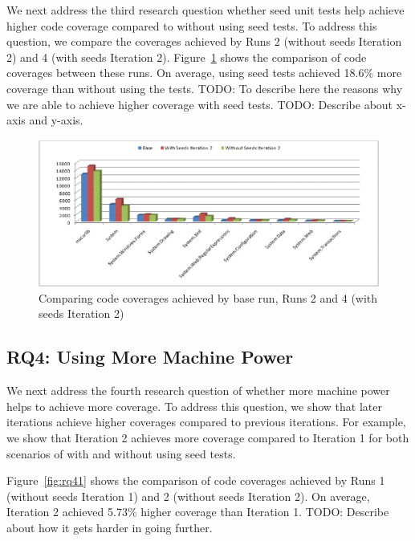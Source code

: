 We next address the third research question whether seed unit tests help achieve 
higher code coverage compared to without using seed tests. To address this question,
we compare the coverages achieved by Runs 2 (without seeds Iteration 2) and 4 (with seeds
Iteration 2). Figure~\ref{fig:rq3} shows the comparison of code coverages between these runs.
On average, using seed tests achieved 18.6\% more coverage than without using the tests.
TODO: To describe here the reasons why we are able to achieve higher coverage with seed tests.
TODO: Describe about x-axis and y-axis.

\begin{figure}[t]
\centering
\includegraphics[scale=0.70,clip]{figs/RQ3_1.eps}\vspace*{-1ex}
\caption{Comparing code coverages achieved by base run, Runs 2 and 4 (with seeds Iteration 2)} \label{fig:rq3}
\end{figure}

\subsection{RQ4: Using More Machine Power}

We next address the fourth research question of whether more machine power helps to
achieve more coverage. To address this question, we show that later iterations achieve higher
coverages compared to previous iterations. For example, we show that Iteration 2 achieves 
more coverage compared to Iteration 1 for both scenarios of with and without using seed tests.

Figure~\ref{fig:rq41} shows the comparison of code coverages achieved by Runs 1 (without seeds Iteration 1) 
and 2 (without seeds Iteration 2). On average, Iteration 2 achieved 5.73\% higher coverage than 
Iteration 1. TODO: Describe about how it gets harder in going further.

